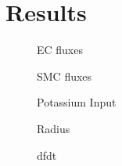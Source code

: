 \section{Results}


\begin{landscape} 
\begin{figure}[h!]
	\centering
	\tiny 
	\setlength\figureheight{2.5 cm} 
	\setlength\figurewidth{4 cm}
	
	\caption{EC fluxes}
	\label{fig:ECfluxes}
\end{figure}

\begin{figure}[h!]
	\centering
	\tiny 
	\setlength\figureheight{2.5 cm} 
	\setlength\figurewidth{3.5 cm}
	
	\caption{SMC fluxes}
	\label{fig:SMCfluxes}
\end{figure}

\begin{figure}[h!]
	\centering
	\tiny 
	\setlength\figureheight{2.5 cm} 
	\setlength\figurewidth{18 cm}
	
	\caption{Potassium Input}
	\label{fig:K}
\end{figure}

\begin{figure}[h!]
	\centering
	\tiny 
	\setlength\figureheight{3.5cm} 
	\setlength\figurewidth{9 cm}
	
	\caption{Radius}
	\label{fig:Radius}
\end{figure}

\begin{figure}[h!]
	\centering
	\tiny 
	\setlength\figureheight{2cm} 
	\setlength\figurewidth{9 cm}
	
	\caption{dfdt}
	\label{fig:dfdt}
\end{figure}
\end{landscape} 